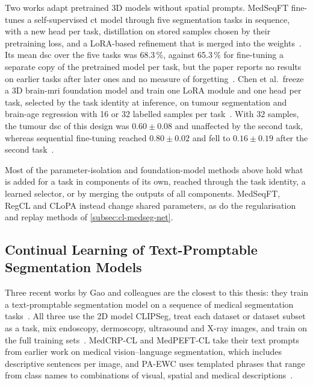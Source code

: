 Two works adapt pretrained 3D models without spatial prompts.
MedSeqFT fine-tunes a self-supervised \gls{ct} model through five segmentation tasks in sequence, with a new head per task, distillation on stored samples chosen by their pretraining loss, and a LoRA-based refinement that is merged into the weights~\cite{ye2025medseqft}.
Its mean \gls{dsc} over the five tasks was 68.3\,\%, against 65.3\,\% for fine-tuning a separate copy of the pretrained model per task, but the paper reports no results on earlier tasks after later ones and no measure of forgetting~\cite{ye2025medseqft}.
Chen et al.\ freeze a 3D brain-\gls{mri} foundation model and train one LoRA module and one head per task, selected by the task identity at inference, on tumour segmentation and brain-age regression with 16 or 32 labelled samples per task~\cite{chen2026fewshotcontinuallearning3d}.
With 32 samples, the tumour \gls{dsc} of this design was $0.60 \pm 0.08$ and unaffected by the second task, whereas sequential fine-tuning reached $0.80 \pm 0.02$ and fell to $0.16 \pm 0.19$ after the second task~\cite{chen2026fewshotcontinuallearning3d}.

Most of the parameter-isolation and foundation-model methods above hold what is added for a task in components of its own, reached through the task identity, a learned selector, or by merging the outputs of all components.
MedSeqFT, RegCL and CLoPA instead change shared parameters, as do the regularisation and replay methods of \cref{subsec:cl-medseg-net}.

\subsection{Continual Learning of Text-Promptable Segmentation Models}
\label{subsec:cl-medseg-text}

Three recent works by Gao and colleagues are the closest to this thesis: they train a text-promptable segmentation model on a sequence of medical segmentation tasks~\cite{gao2026medcrpcl,gao2025paewc,gao2026medpeftcl}.
All three use the 2D model CLIPSeg, treat each dataset or dataset subset as a task, mix endoscopy, dermoscopy, ultrasound and X-ray images, and train on the full training sets~\cite{gao2026medcrpcl,gao2025paewc,gao2026medpeftcl}.
MedCRP-CL and MedPEFT-CL take their text prompts from earlier work on medical vision--language segmentation, which includes descriptive sentences per image, and PA-EWC uses templated phrases that range from class names to combinations of visual, spatial and medical descriptions~\cite{gao2026medcrpcl,gao2026medpeftcl,gao2025paewc}.

